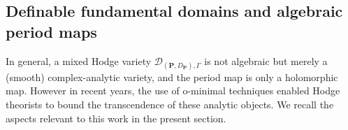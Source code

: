 \documentclass[10pt]{article}
\numberwithin{equation}{subsection}
\theoremstyle{plain}
\newtheorem{lemma}[theorem]{Lemma}
\theoremstyle{definition}
\theoremstyle{remark}
\newcommand{\C}{\mathbb C}
\newcommand{\pp}{\mathbf P}
\newcommand{\period}{\mathscr{D}}
\begin{document}
%
\subsection{Definable fundamental domains and algebraic period maps}
In general, a mixed Hodge variety $\period_{(\pp, D_\pp), \Gamma}$ is not algebraic but merely a (smooth) complex-analytic variety, and the period map is only a holomorphic map. However in recent years, the use of o-minimal techniques enabled Hodge theorists to bound the transcendence of these analytic objects. We recall the aspects relevant to this work in the present section.
\end{document}
